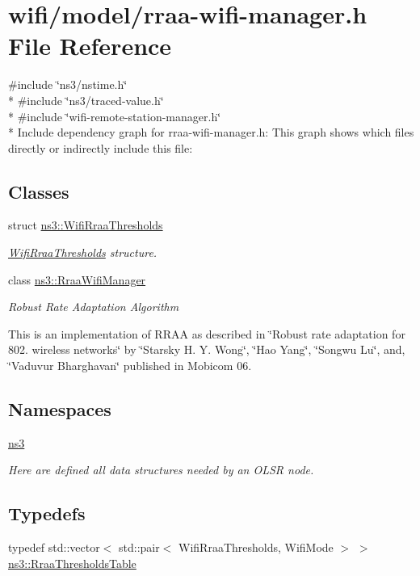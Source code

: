 \hypertarget{rraa-wifi-manager_8h}{}\section{wifi/model/rraa-\/wifi-\/manager.h File Reference}
\label{rraa-wifi-manager_8h}
{\ttfamily \#include \char`\"{}ns3/nstime.\+h\char`\"{}}\\*
{\ttfamily \#include \char`\"{}ns3/traced-\/value.\+h\char`\"{}}\\*
{\ttfamily \#include \char`\"{}wifi-\/remote-\/station-\/manager.\+h\char`\"{}}\\*
Include dependency graph for rraa-\/wifi-\/manager.h\+:
This graph shows which files directly or indirectly include this file\+:
\subsection*{Classes}
\begin{DoxyCompactItemize}
\item 
struct \hyperlink{structns3_1_1WifiRraaThresholds}{ns3\+::\+Wifi\+Rraa\+Thresholds}
\begin{DoxyCompactList}\small\item\em \hyperlink{structns3_1_1WifiRraaThresholds}{Wifi\+Rraa\+Thresholds} structure. \end{DoxyCompactList}\item 
class \hyperlink{classns3_1_1RraaWifiManager}{ns3\+::\+Rraa\+Wifi\+Manager}
\begin{DoxyCompactList}\small\item\em Robust Rate Adaptation Algorithm

This is an implementation of R\+R\+AA as described in \char`\"{}\+Robust rate adaptation for 802. wireless networks\char`\"{} by \char`\"{}\+Starsky H. Y. Wong\char`\"{}, \char`\"{}\+Hao Yang\char`\"{}, \char`\"{}\+Songwu Lu\char`\"{}, and, \char`\"{}\+Vaduvur Bharghavan\char`\"{} published in Mobicom 06. \end{DoxyCompactList}\end{DoxyCompactItemize}
\subsection*{Namespaces}
\begin{DoxyCompactItemize}
\item 
 \hyperlink{namespacens3}{ns3}
\begin{DoxyCompactList}\small\item\em Here are defined all data structures needed by an O\+L\+SR node. \end{DoxyCompactList}\end{DoxyCompactItemize}
\subsection*{Typedefs}
\begin{DoxyCompactItemize}
\item 
typedef std\+::vector$<$ std\+::pair$<$ Wifi\+Rraa\+Thresholds, Wifi\+Mode $>$ $>$ \hyperlink{namespacens3_a726225cd2329a9841319922125c6344b}{ns3\+::\+Rraa\+Thresholds\+Table}
\end{DoxyCompactItemize}
